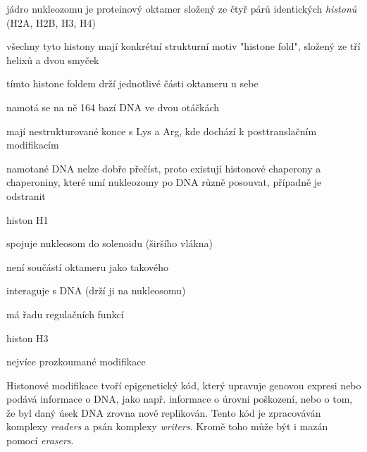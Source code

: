 \documentclass[DIV=8]{scrreprt}
\begin{document}
\begin{myItemize}[nosep]
    \item jádro nukleozomu je proteinový oktamer složený ze čtyř párů identických \emph{histonů} (H2A, H2B, H3, H4)
\begin{myItemize}[nosep]
    \item všechny tyto histony mají konkrétní strukturní motiv "histone fold", složený ze tří helixů a dvou smyček
    \item tímto histone foldem drží jednotlivé části oktameru u sebe
\end{myItemize}

    \item namotá se na ně 164 bazí DNA ve dvou otáčkách
    \item mají nestrukturované konce s Lys a Arg, kde dochází k posttranslačním modifikacím
    \item namotané DNA nelze dobře přečíst, proto existují histonové chaperony a chaperoniny, které umí nukleozomy po DNA různě posouvat, případně je odstranit
    \item histon H1
\begin{myItemize}[nosep]
    \item spojuje nukleosom do solenoidu (širšího vlákna)
    \item není součástí oktameru jako takového
    \item interaguje s DNA (drží ji na nukleosomu)
    \item má řadu regulačních funkcí
\end{myItemize}

    \item histon H3
\begin{myItemize}[nosep]
    \item nejvíce prozkoumané modifikace
\end{myItemize}

\end{myItemize}



Histonové modifikace tvoří epigenetický kód, který upravuje genovou expresi nebo podává informace o DNA, jako např. informace o úrovni poškození, nebo o tom, že byl daný úsek DNA zrovna nově replikován. Tento kód je zpracováván komplexy \emph{readers} a psán komplexy \emph{writers}. Kromě toho může být i mazán pomocí \emph{erasers}.
\end{document}
